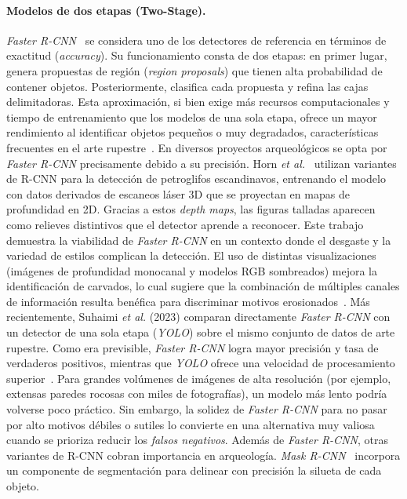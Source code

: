 \paragraph{Modelos de dos etapas (Two-Stage).}
\textit{Faster R-CNN}~\cite{ren2015faster} se considera uno de los detectores de referencia en términos de exactitud (\textit{accuracy}).
Su funcionamiento consta de dos etapas: en primer lugar, genera propuestas de región (\textit{region proposals}) que tienen alta probabilidad de contener objetos. Posteriormente, clasifica cada propuesta y refina las cajas delimitadoras.
Esta aproximación, si bien exige más recursos computacionales y tiempo de entrenamiento que los modelos de una sola etapa, ofrece un mayor rendimiento al identificar objetos pequeños o muy degradados, características frecuentes en el arte rupestre~\cite{suhaimi2023,horn2022ai}.
En diversos proyectos arqueológicos se opta por \textit{Faster R-CNN} precisamente debido a su precisión.
Horn \textit{et al.}~\cite{horn2022} utilizan variantes de R-CNN para la detección de petroglifos escandinavos, entrenando el modelo con datos derivados de escaneos láser 3D que se proyectan en mapas de profundidad en 2D.
Gracias a estos \emph{depth maps}, las figuras talladas aparecen como relieves distintivos que el detector aprende a reconocer.
Este trabajo demuestra la viabilidad de \textit{Faster R-CNN} en un contexto donde el desgaste y la variedad de estilos complican la detección.
El uso de distintas visualizaciones (imágenes de profundidad monocanal y modelos RGB sombreados) mejora la identificación de carvados, lo cual sugiere que la combinación de múltiples canales de información resulta benéfica para discriminar motivos erosionados~\cite{horn2022ai,horn2022}.
Más recientemente, Suhaimi \textit{et al.} (2023) comparan directamente \textit{Faster R-CNN} con un detector de una sola etapa (\textit{YOLO}) sobre el mismo conjunto de datos de arte rupestre.
Como era previsible, \textit{Faster R-CNN} logra mayor precisión y tasa de verdaderos positivos, mientras que \textit{YOLO} ofrece una velocidad de procesamiento superior~\cite{suhaimi2023}.
Para grandes volúmenes de imágenes de alta resolución (por ejemplo, extensas paredes rocosas con miles de fotografías), un modelo más lento podría volverse poco práctico. Sin embargo, la solidez de \textit{Faster R-CNN} para no pasar por alto motivos débiles o sutiles lo convierte en una alternativa muy valiosa cuando se prioriza reducir los \textit{falsos negativos}.
Además de \textit{Faster R-CNN}, otras variantes de R-CNN cobran importancia en arqueología. \textit{Mask R-CNN}~\cite{he2017mask} incorpora un componente de segmentación para delinear con precisión la silueta de cada objeto.
